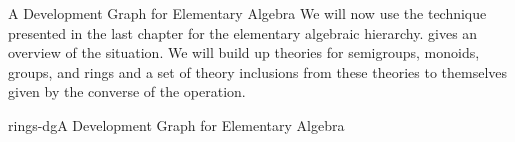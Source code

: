 
\begin{tchapter}[id=dg-elal]{A Development Graph for Elementary Algebra}
  We will now use the technique presented in the last chapter for the elementary algebraic
  hierarchy. {} gives an overview of the situation. We will build up
  theories for semigroups, monoids, groups, and rings and a set of theory inclusions from
  these theories to themselves given by the converse of the operation.

\begin{myfig}{rings-dg}{A Development Graph for Elementary Algebra}
\end{myfig}
\end{tchapter}
